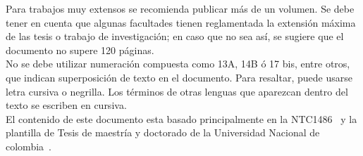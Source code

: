 Para trabajos muy extensos se recomienda publicar más de un volumen. Se debe tener en cuenta que algunas facultades tienen reglamentada la extensión máxima de las tesis  o trabajo de investigación; en caso que no sea así, se sugiere que el documento no supere 120 páginas.\\

No se debe utilizar numeración compuesta como 13A, 14B ó 17 bis, entre otros, que indican superposición de texto en el documento. Para resaltar, puede usarse letra cursiva o negrilla. Los términos de otras lenguas que aparezcan dentro del texto se escriben en cursiva.\\

El contenido de este documento esta basado principalmente en la NTC1486~\cite{NTC14862008} y la plantilla de Tesis de maestría y doctorado de la Universidad Nacional de colombia~\cite{Unal2014DocTesis}.


